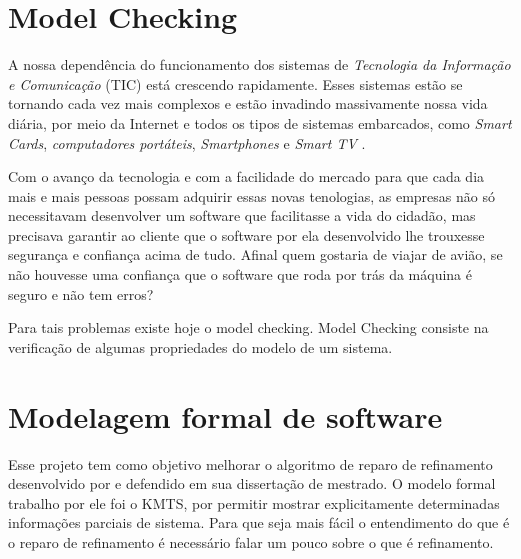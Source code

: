 \section{Model Checking} \label{par-reg}


A nossa dependência do funcionamento dos sistemas de \textit{Tecnologia da Informação e Comunicação} (TIC) está crescendo rapidamente. Esses sistemas estão se tornando cada vez mais complexos e estão invadindo massivamente nossa vida diária, por meio da Internet e todos os tipos de sistemas embarcados, como \textit{Smart Cards}, \textit{computadores portáteis}, \textit{Smartphones} e \textit{Smart TV} \cite{baier2008principles}.

Com o avanço da tecnologia e com a facilidade do mercado para que cada dia mais e mais pessoas possam adquirir essas novas tenologias, as empresas não só necessitavam desenvolver um software que facilitasse a vida do cidadão, mas precisava garantir ao cliente que o software por ela desenvolvido lhe trouxesse segurança e confiança acima de tudo. Afinal quem gostaria de viajar de avião, se não houvesse uma confiança que o software que roda por trás da máquina é seguro e não tem erros?



Para tais problemas existe hoje o model checking. Model Checking consiste na verificação de algumas propriedades do modelo de um sistema.

\section{Modelagem formal de software}

Esse projeto tem como objetivo melhorar o algoritmo de reparo de refinamento desenvolvido por \cite{machado2017uso} e defendido em sua dissertação de mestrado. O modelo formal trabalho por ele foi o KMTS, por permitir mostrar explicitamente determinadas informações parciais de sistema. Para que seja mais fácil o entendimento do que é o reparo de refinamento é necessário falar um pouco sobre o que é refinamento.

